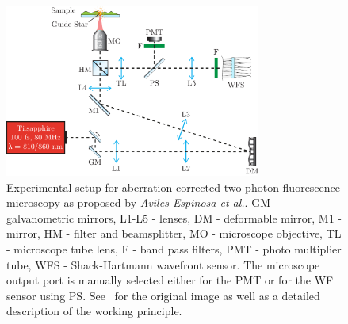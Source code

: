 \begin{figure}
	\centering
		\includegraphics[width=0.75\textwidth]{images/TPFM_guide-star}
	\caption{Experimental setup for aberration corrected two-photon fluorescence microscopy as proposed by \emph{Aviles-Espinosa et al.}. GM - galvanometric mirrors, L1-L5 - lenses, DM - deformable mirror, M1 - mirror, HM - filter and beamsplitter, MO - microscope objective, TL - microscope tube lens, F - band pass filters, PMT - photo multiplier tube, WFS - Shack-Hartmann wavefront sensor. The microscope output port is manually selected either for the PMT or for the WF sensor using PS. See~\cite{scan_TPFM_guide_start} for the original image as well as a detailed description of the working principle.}
	\label{fig:TPFM_guide-star}
\end{figure}


